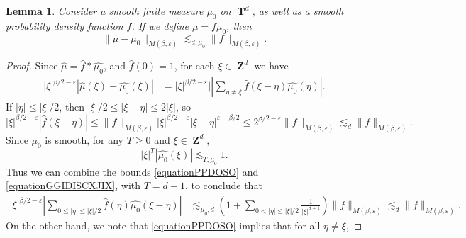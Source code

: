 \documentclass[12pt,reqno]{article}
\numberwithin{equation}{section}
\DeclareMathOperator{\ZZ}{\mathbf{Z}}
\DeclareMathOperator{\TT}{\mathbf{T}}
\newtheorem{lemma}[theorem]{Lemma}
\begin{document}
\begin{lemma} \label{LemmaTTSICICS}
    Consider a smooth finite measure $\mu_0$ on $\TT^d$, as well as a smooth probability density function $f$. If we define $\mu = f \mu_0$, then
    \[ \| \mu - \mu_0 \|_{M(\beta,\varepsilon)} \lesssim_{d,\mu_0} \| f \|_{M(\beta,\varepsilon)}. \]
\end{lemma}
\begin{proof}
    Since $\widehat{\mu} = \widehat{f} * \widehat{\mu_0}$, and $\widehat{f}(0) = 1$, for each $\xi \in \ZZ^d$ we have
    \begin{equation} \label{equationPPYTUECUUCS}
    \begin{split}
        |\xi|^{\beta/2 - \varepsilon} |\widehat{\mu}(\xi) - \widehat{\mu_0}(\xi)| &= |\xi|^{\beta/2 - \varepsilon}| \left| \sum_{\eta \neq \xi} \widehat{f}(\xi - \eta) \widehat{\mu_0}(\eta) \right|.
    \end{split}
    \end{equation}
    If $|\eta| \leq |\xi|/2$, then $|\xi|/2 \leq |\xi - \eta| \leq 2 |\xi|$, so
    \begin{equation} \label{equationPPDOSO}
        |\xi|^{\beta/2 - \varepsilon} |\widehat{f}(\xi - \eta)| \leq \| f \|_{M(\beta,\varepsilon)} |\xi|^{\beta/2 - \varepsilon} |\xi-\eta|^{\varepsilon-\beta/2} \leq 2^{\beta/2 - \varepsilon} \| f \|_{M(\beta,\varepsilon)} \lesssim_d \| f \|_{M(\beta,\varepsilon)}.
    \end{equation}
    Since $\mu_0$ is smooth, for any $T \geq 0$ and $\xi \in \ZZ^d$,
    \begin{equation} \label{equationGGIDISCXJIX}
        |\xi|^T |\widehat{\mu_0}(\xi)| \lesssim_{T,\mu_0} 1.
    \end{equation}
    Thus we can combine the bounds \eqref{equationPPDOSO} and \eqref{equationGGIDISCXJIX}, with $T = d+1$, to conclude that
    \begin{equation} \label{equationGGPSOVVCSI}
    \begin{split}
        |\xi|^{\beta/2 - \varepsilon} \left| \sum_{0 \leq |\eta| \leq |\xi|/2} \widehat{f}(\eta) \widehat{\mu_0}(\xi - \eta) \right| &\lesssim_{\mu_0,d} \left( 1 + \sum_{0 < |\eta| \leq |\xi|/2} \frac{1}{|\xi|^{d+1}} \right) \| f \|_{M(\beta,\varepsilon)} \lesssim_d \| f \|_{M(\beta,\varepsilon)}.
    \end{split}
    \end{equation}
    On the other hand, we note that \eqref{equationPPDOSO} implies that for all $\eta \neq \xi$,

\end{proof}
\end{document}
